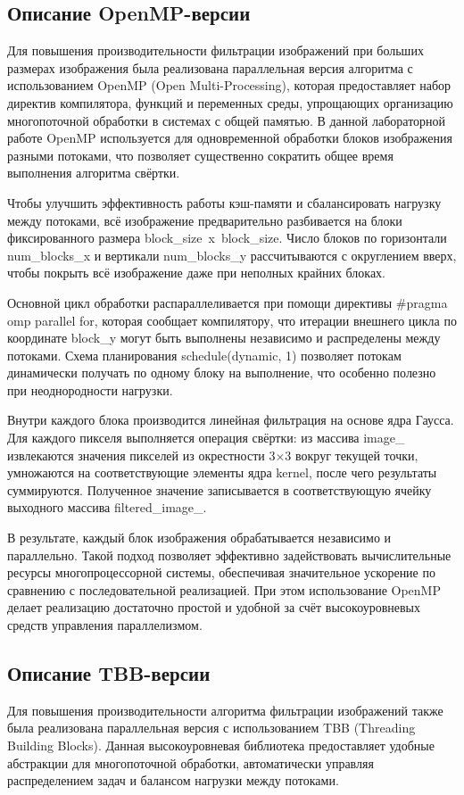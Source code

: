 \documentclass[14pt, a4paper]{extarticle}
\newcommand{\code}[1]{{\ttfamily\fontsize{14pt}{16pt}\selectfont #1}}
\begin{document}
\subsection{Описание OpenMP-версии}
Для повышения производительности фильтрации изображений при больших размерах изображения была реализована параллельная версия алгоритма с использованием OpenMP (Open Multi-Processing), которая предоставляет набор директив компилятора, функций и переменных среды, упрощающих организацию многопоточной обработки в системах с общей памятью. В данной лабораторной работе OpenMP используется для одновременной обработки блоков изображения разными потоками, что позволяет существенно сократить общее время выполнения алгоритма свёртки.

Чтобы улучшить эффективность работы кэш-памяти и сбалансировать нагрузку между потоками, всё изображение предварительно разбивается на блоки фиксированного размера \code{block\_size~x~block\_size}. Число блоков по горизонтали \code{num\_blocks\_x} и вертикали \code{num\_blocks\_y} рассчитываются с округлением вверх, чтобы покрыть всё изображение даже при неполных крайних блоках.

Основной цикл обработки распараллеливается при помощи директивы \code{\#pragma omp parallel for}, которая сообщает компилятору, что итерации внешнего цикла по координате \code{block\_y} могут быть выполнены независимо и распределены между потоками. Схема планирования \code{schedule(dynamic, 1)} позволяет потокам динамически получать по одному блоку на выполнение, что особенно полезно при неоднородности нагрузки.

Внутри каждого блока производится линейная фильтрация на основе ядра Гаусса. Для каждого пикселя выполняется операция свёртки: из массива  \code{image\_} извлекаются значения пикселей из окрестности 3×3 вокруг текущей точки, умножаются на соответствующие элементы ядра  \code{kernel}, после чего результаты суммируются. Полученное значение записывается в соответствующую ячейку выходного массива  \code{filtered\_image\_}.

В результате, каждый блок изображения обрабатывается независимо и параллельно. Такой подход позволяет эффективно задействовать вычислительные ресурсы многопроцессорной системы, обеспечивая значительное ускорение по сравнению с последовательной реализацией. При этом использование OpenMP делает реализацию достаточно простой и удобной за счёт высокоуровневых средств управления параллелизмом.


\subsection{Описание TBB-версии}
Для повышения производительности алгоритма фильтрации изображений также была реализована параллельная версия с использованием TBB (Threading Building Blocks). Данная высокоуровневая библиотека предоставляет удобные абстракции для многопоточной обработки, автоматически управляя распределением задач и балансом нагрузки между потоками.
\end{document}

